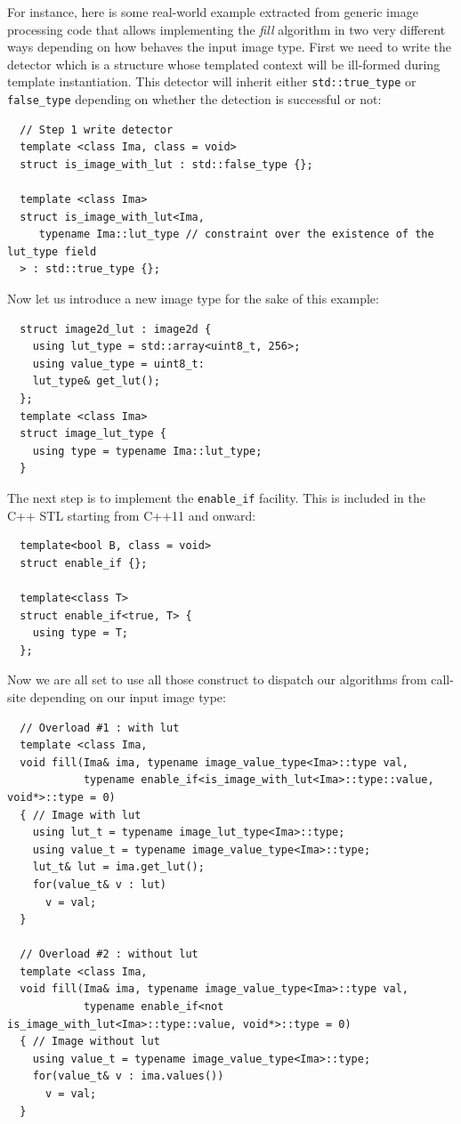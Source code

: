 For instance, here is some real-world example extracted from generic image processing code that allows implementing the
\emph{fill} algorithm in two very different ways depending on how behaves the input image type. First we need to write
the detector which is a structure whose templated context will be ill-formed during template instantiation. This
detector will inherit either \texttt{std::true\_type} or \texttt{false\_type} depending on whether the detection is
successful or not:

\begin{verbatim}
  // Step 1 write detector
  template <class Ima, class = void>
  struct is_image_with_lut : std::false_type {};

  template <class Ima>
  struct is_image_with_lut<Ima,
     typename Ima::lut_type // constraint over the existence of the lut_type field
  > : std::true_type {};
\end{verbatim}

Now let us introduce a new image type for the sake of this example:

\begin{verbatim}
  struct image2d_lut : image2d {
    using lut_type = std::array<uint8_t, 256>;
    using value_type = uint8_t:
    lut_type& get_lut();
  };
  template <class Ima>
  struct image_lut_type {
    using type = typename Ima::lut_type;
  }
\end{verbatim}

The next step is to implement the \texttt{enable\_if} facility. This is included in the C++ STL starting from C++11 and
onward:

\begin{verbatim}
  template<bool B, class = void>
  struct enable_if {};

  template<class T>
  struct enable_if<true, T> {
    using type = T;
  };
\end{verbatim}

Now we are all set to use all those construct to dispatch our algorithms from call-site depending on our input image
type:

\begin{verbatim}
  // Overload #1 : with lut
  template <class Ima,
  void fill(Ima& ima, typename image_value_type<Ima>::type val,
            typename enable_if<is_image_with_lut<Ima>::type::value, void*>::type = 0)
  { // Image with lut
    using lut_t = typename image_lut_type<Ima>::type;
    using value_t = typename image_value_type<Ima>::type;
    lut_t& lut = ima.get_lut();
    for(value_t& v : lut)
      v = val;
  }

  // Overload #2 : without lut
  template <class Ima,
  void fill(Ima& ima, typename image_value_type<Ima>::type val,
            typename enable_if<not is_image_with_lut<Ima>::type::value, void*>::type = 0)
  { // Image without lut
    using value_t = typename image_value_type<Ima>::type;
    for(value_t& v : ima.values())
      v = val;
  }
\end{verbatim}

